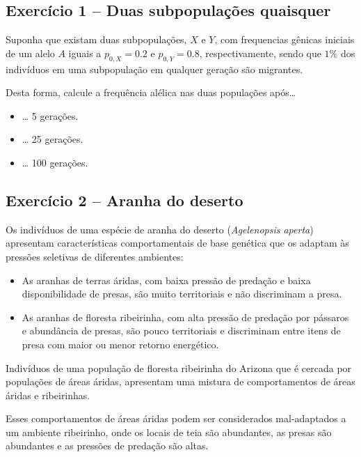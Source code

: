 \documentclass[
]{book}
\begin{document}
\hypertarget{exercuxedcio-1-duas-subpopulauxe7uxf5es-quaisquer}{%
\subsection{Exercício 1 -- Duas subpopulações quaisquer}\label{exercuxedcio-1-duas-subpopulauxe7uxf5es-quaisquer}}

Suponha que existam duas subpopulações, \(X\) e \(Y\), com frequencias gênicas iniciais de um alelo \(A\) iguais a \(p_{0,X}=0.2\) e \(p_{0,Y}=0.8\), respectivamente, sendo que \(1\%\) dos indivíduos em uma subpopulação em qualquer geração são migrantes.

Desta forma, calcule a frequência alélica nas duas populações após\ldots{}

\begin{itemize}
\item
  \ldots{} 5 gerações.
\item
  \ldots{} 25 gerações.
\item
  \ldots{} 100 gerações.
\end{itemize}

\hypertarget{exercuxedcio-2-aranha-do-deserto}{%
\subsection{Exercício 2 -- Aranha do deserto}\label{exercuxedcio-2-aranha-do-deserto}}

Os indivíduos de uma espécie de aranha do deserto (\emph{Agelenopsis aperta}) apresentam características comportamentais de base genética que os adaptam às pressões seletivas de diferentes ambientes:

\begin{itemize}
\item
  As aranhas de terras áridas, com baixa pressão de predação e baixa disponibilidade de presas, são muito territoriais e não discriminam a presa.
\item
  As aranhas de floresta ribeirinha, com alta pressão de predação por pássaros e abundância de presas, são pouco territoriais e discriminam entre itens de presa com maior ou menor retorno energético.
\end{itemize}

Indivíduos de uma população de floresta ribeirinha do Arizona que é cercada por populações de áreas áridas, apresentam uma mistura de comportamentos de áreas áridas e ribeirinhas.

Esses comportamentos de áreas áridas podem ser considerados mal-adaptados a um ambiente ribeirinho, onde os locais de teia são abundantes, as presas são abundantes e as pressões de predação são altas.
\end{document}
